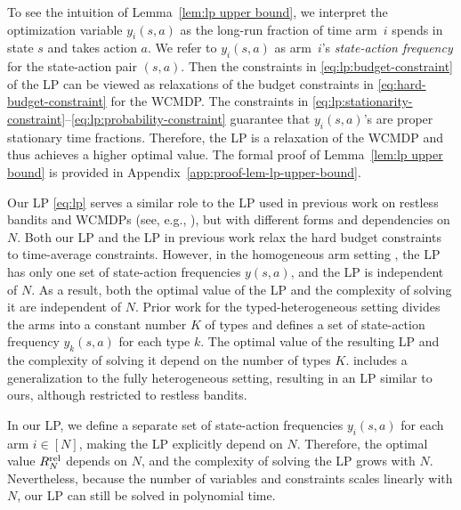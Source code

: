 \documentclass{article}
\theoremstyle{plain}
\theoremstyle{remark}
\newcommand{\rel}{\textup{rel}} %
\begin{document}
To see the intuition of Lemma~\ref{lem:lp upper bound}, we interpret the optimization variable $y_i(s,a)$ as the long-run fraction of time arm~$i$ spends in state $s$ and takes action $a$.
We refer to $y_i(s,a)$ as arm~$i$'s \emph{state-action frequency} for the state-action pair $(s,a)$.
Then the constraints in \eqref{eq:lp:budget-constraint} of the LP can be viewed as relaxations of the budget constraints in \eqref{eq:hard-budget-constraint} for the WCMDP.
The constraints in \eqref{eq:lp:stationarity-constraint}--\eqref{eq:lp:probability-constraint} guarantee that $y_i(s,a)$'s are proper stationary time fractions.
Therefore, the LP is a relaxation of the WCMDP and thus achieves a higher optimal value.
The formal proof of Lemma~\ref{lem:lp upper bound} is provided in Appendix~\ref{app:proof-lem-lp-upper-bound}.



Our LP \eqref{eq:lp} serves a similar role to the LP used in previous work on restless bandits and WCMDPs (see, e.g., \citep{WebWei_90,Ver_16_verloop,GasGauYan_23_exponential,HodGla_15,XioWanLi_22,GolAvr_24_wcmdp_multichain,HonXieChe_23}), but with different forms and dependencies on $N$. 
Both our LP and the LP in previous work relax the hard budget constraints to time-average constraints. 
However, in the homogeneous arm setting \citep{WebWei_90,GasGauYan_23_exponential,HodGla_15,GolAvr_24_wcmdp_multichain}, the LP has only one set of state-action frequencies $y(s,a)$, and the LP is independent of $N$.
As a result, both the optimal value of the LP and the complexity of solving it are independent of $N$. 
Prior work for the typed-heterogeneous setting \citep{XioWanLi_22,Ver_16_verloop,HonXieChe_23} divides the arms into a constant number $K$ of types and defines a set of state-action frequency $y_k(s,a)$ for each type $k$. The optimal value of the resulting LP and the complexity of solving it depend on the number of types $K$.
\citet{HonXieChe_23} includes a generalization to the fully heterogeneous setting, resulting in an LP similar to ours, although restricted to restless bandits.


In our LP, we define a separate set of state-action frequencies $y_i(s,a)$ for each arm $i\in[N]$, making the LP explicitly depend on $N$. 
Therefore, the optimal value $R_N^{\rel}$ depends on $N$, and the complexity of solving the LP grows with $N$. 
Nevertheless, because the number of variables and constraints scales linearly with $N$, our LP can still be solved in polynomial time.
\end{document}
